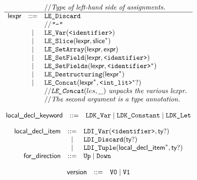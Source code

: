 \documentclass{book}
\begin{document}
\[
\begin{array}{rcl}
& & // \textit{Type of left-hand side of assignments.}\ \\
\hline
\textsf{lexpr} &::=& \texttt{LE\_Discard}\\
  & & // \textit{\texttt{"-"}}\ \\
  &|& \texttt{LE\_Var}(\texttt{<identifier>})\\
  &|& \texttt{LE\_Slice}(\textsf{lexpr}, \textsf{slice}^*)\\
  &|& \texttt{LE\_SetArray}(\textsf{lexpr}, \textsf{expr})\\
  &|& \texttt{LE\_SetField}(\textsf{lexpr}, \texttt{<identifier>})\\
  &|& \texttt{LE\_SetFields}(\textsf{lexpr}, \texttt{<identifier>}^*)\\
  &|& \texttt{LE\_Destructuring}(\textsf{lexpr}^*)\\
  &|& \texttt{LE\_Concat}(\textsf{lexpr}^*, \texttt{<int\_lit>}^*?)\\
  & & // \textit{\texttt{LE\_Concat}$(les, \_)$ unpacks the various lexpr.}\ \\
  & & // \textit{The second argument is a type annotation.}\ \\
\end{array}
\]

\[
\begin{array}{rcl}
\textsf{local\_decl\_keyword} &::=& \texttt{LDK\_Var} \;|\; \texttt{LDK\_Constant} \;|\; \texttt{LDK\_Let}\\
\end{array}
\]

\[
\begin{array}{rcl}
\textsf{local\_decl\_item} &::=& \texttt{LDI\_Var}(\texttt{<identifier>}, \textsf{ty}?)\\
  &|& \texttt{LDI\_Discard}(\textsf{ty}?)\\
  &|& \texttt{LDI\_Tuple}(\textsf{local\_decl\_item}^*, \textsf{ty}?)\\
\textsf{for\_direction} &::=& \texttt{Up} \;|\; \texttt{Down}\\
\end{array}
\]

\[
\begin{array}{rcl}
\textsf{version} &::=& \texttt{V0} \;|\; \texttt{V1}\\
\end{array}
\]
\end{document}
